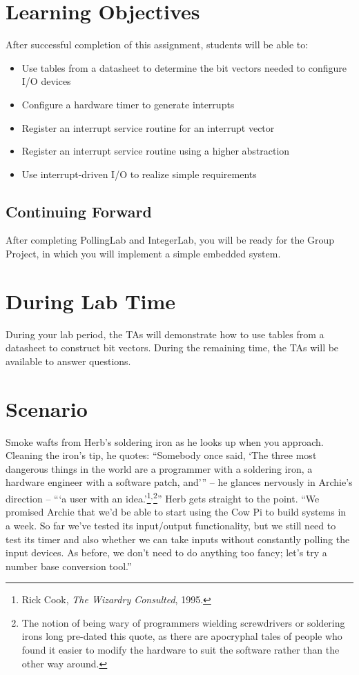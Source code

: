 \section*{Learning Objectives}

After successful completion of this assignment, students will be able to:
\begin{itemize}
\item Use tables from a datasheet to determine the bit vectors needed to
    configure I/O devices
\item Configure a hardware timer to generate interrupts
\item Register an interrupt service routine for an interrupt vector
\item Register an interrupt service routine using a higher abstraction
\item Use interrupt-driven I/O to realize simple requirements
\end{itemize}

\subsection*{Continuing Forward}

After completing PollingLab and IntegerLab, you will be ready for the Group
Project, in which you will implement a simple embedded system.

\section*{During Lab Time}

During your lab period, the TAs will demonstrate how to use tables from a
datasheet to construct bit vectors. During the remaining time, the TAs will be
available to answer questions.

\softwareengineeringfrontmatter

\section{Scenario}

Smoke wafts from Herb's soldering iron as he looks up when you approach.
Cleaning the iron's tip, he quotes: ``Somebody once said, `The three most
dangerous things in the world are a programmer with a soldering iron, a
hardware engineer with a software patch, and'{}'' -- he glances nervously in
Archie's direction -- ``{}`a user with an idea.'\footnote{Rick Cook, \textit{The
Wizardry Consulted}, 1995.}$^{\mathrm{,}}$\footnote{The notion of being wary of
programmers wielding screwdrivers or soldering irons long pre-dated this quote,
as there are apocryphal tales of people who found it easier to modify the
hardware to suit the software rather than the other way around.}'' Herb gets
straight to the point. ``We promised Archie that we'd be able to start using
the Cow Pi to build systems in a week. So far we've tested its input/output
functionality, but we still need to test its timer and also whether we can take
inputs without constantly polling the input devices. As before, we don't need
to do anything too fancy; let's try a number base conversion tool.''

